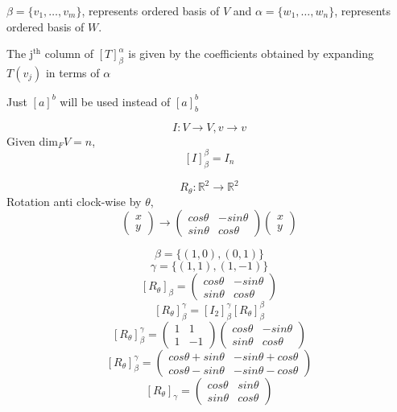 \documentclass[11pt,a4paper]{colorart}
\def\l{\left}
\def\r{\right}
\def\R{\mathbb{R}}
\def\a{\alpha}
\def\b{\beta}
\def\g{\gamma}
\begin{document}
$\b = \{ v_1,\dots,v_m\}$, represents ordered basis of $V$ and $\a = \{ w_1,\dots,w_n\}$, represents ordered basis of $W$. 

The j$^\text{th}$ column of $\l[T\r]^\a_\b$ is given by the coefficients obtained by expanding $T\l(v_j\r)$ in terms of $\a$

\begin{convention}
	Just $\l[a\r]^b$ will be used instead of $\l[a\r]^b_b$
\end{convention}

\begin{example}
	\[ I: V\rightarrow V, v \rightarrow v \] 
	Given dim$_FV=n$,
	\[ \l[I\r]_\b^\b = I_n \]
\end{example}

\begin{example}
	\[ R_\theta : \R^2 \rightarrow \R^2 \]
	Rotation anti clock-wise by $\theta$,
	\[ \begin{pmatrix}x\\y\end{pmatrix} \rightarrow 
		\begin{pmatrix} cos\theta & -sin\theta \\ sin\theta & cos\theta \end{pmatrix}
		\begin{pmatrix}x\\y\end{pmatrix}   \]

	\[ \b = \{\l(1,0\r),\l(0,1\r)\} \]
	\[ \g = \{\l(1,1\r),\l(1,-1\r)\} \]
	\[ \l[R_\theta\r]_\b = \begin{pmatrix} cos\theta & -sin\theta \\ sin\theta & cos\theta \end{pmatrix} \]
	\[ \l[R_\theta\r]_\b^\g = \l[I_2\r]^\g_\b \l[R_\theta\r]_\b^\b  \]
	\[ \l[R_\theta\r]_\b^\g = \begin{pmatrix}1&1\\1&-1\end{pmatrix}\begin{pmatrix} cos\theta & -sin\theta \\ sin\theta & cos\theta \end{pmatrix} \]
	\[ \l[R_\theta\r]_\b^\g = \begin{pmatrix} cos\theta + sin\theta & -sin\theta + cos\theta\\ cos\theta - sin\theta & -sin\theta - cos\theta \end{pmatrix} \]
	\[ \l[R_\theta\r]_\g = \begin{pmatrix} cos\theta & sin\theta \\ sin\theta & cos\theta \end{pmatrix} \]
\end{example}
\end{document}
